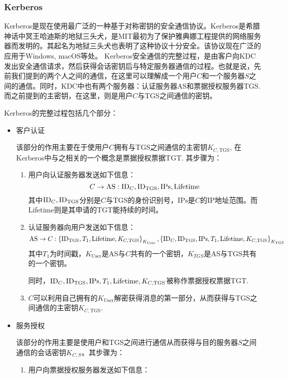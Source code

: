 \subsubsection{Kerberos}
Kerberos是现在使用最广泛的一种基于对称密钥的安全通信协议。Kerberos是希腊神话中冥王哈迪斯的地狱三头犬，是MIT最初为了保护雅典娜工程提供的网络服务器而发明的。其起名为地狱三头犬也表明了这种协议十分安全。该协议现在广泛的应用于Windows, macOS等处。
Kerberos安全通信的完整过程，是由客户向KDC发出安全通信请求，然后获得会话密钥后与特定服务器通信的过程。也就是说，先前我们提到的两个人之间的通信，在这里可以理解成一个用户$C$和一个服务器$S$之间的通信。同时，KDC中也有两个服务器：认证服务器AS和票据授权服务器TGS. 而之前提到的主密钥，在这里，则是用户$C$与TGS之间通信的密钥。\par
Kerberos的完整过程包括几个部分：
\begin{itemize}
	\item 客户认证\par
	该部分的作用主要在于使用户$C$拥有与TGS之间通信的主密钥$K_{C, \mathrm{TGS}}$, 在Kerberos中与之相关的一个概念是票据授权票据TGT. 其步骤为：
	\begin{enumerate}
		\item 用户向认证服务器发送如下信息：
		\[C\to\mathrm{AS}: \mathrm{ID}_C, \mathrm{ID}_{\mathrm{TGS}}, \mathrm{IPs}, \mathrm{Lifetime}\]
		其中$\mathrm{ID}_C, \mathrm{ID}_{\mathrm{TGS}}$分别是$C$与TGS的身份识别号，$\mathrm{IPs}$是$C$的IP地址范围。而Lifetime则是其申请的TGT能持续的时间。
		\item 认证服务器向用户发送如下信息：
		\[\mathrm{AS}\to C: \left\{ {\mathrm{ID}_{\mathrm{TGS}}, T_1, \mathrm{Lifetime}, K_{C, \mathrm{TGS}}} \right\}_{K_{\mathrm{User}}}, \left\{ {\mathrm{ID}_C, \mathrm{ID}_{\mathrm{TGS}}, \mathrm{IPs}, T_1, \mathrm{Lifetime}, K_{C, \mathrm{TGS}}} \right\}_{K_{\mathrm{TGS}}}\]
		其中$T_1$为时间戳，$K_{\mathrm{User}}$是AS与$C$共有的一个密钥，$K_{TGS}$是AS与TGS共有的一个密钥。\par
		同时，$\mathrm{ID}_C, \mathrm{ID}_{\mathrm{TGS}}, \mathrm{IPs}, T_1, \mathrm{Lifetime}, K_{C, \mathrm{TGS}}$被称作票据授权票据TGT.
		\item $C$可以利用自己拥有的$K_{\mathrm{User}}$解密获得消息的第一部分，从而获得与TGS之间通信的主密钥$K_{C, \mathrm{TGS}}$.
	\end{enumerate}
	\item 服务授权\par
	该部分的作用主要是使用户和TGS之间进行通信从而获得与目的服务器$S$之间通信的会话密钥$K_{C, S}$。其步骤为：
	\begin{enumerate}
		\item 用户向票据授权服务器发送如下信息：

\end{enumerate}
\end{itemize}

